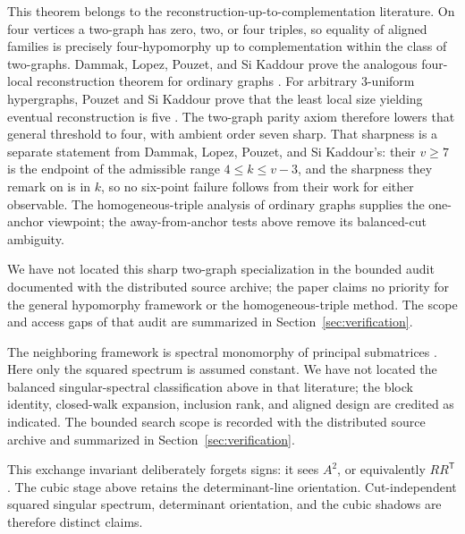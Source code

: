 This theorem belongs to the reconstruction-up-to-complementation literature.
On four vertices a two-graph has zero, two, or four triples, so equality of
aligned families is precisely four-hypomorphy up to complementation within the
class of two-graphs.  Dammak, Lopez, Pouzet, and Si Kaddour prove the analogous
four-local reconstruction theorem for ordinary graphs
\cite{DammakGraphHypomorphy}.  For arbitrary \(3\)-uniform hypergraphs,
Pouzet and Si Kaddour prove that the least local size yielding eventual
reconstruction is five \cite{PouzetHypergraphIsomorphy}.  The two-graph parity
axiom therefore lowers that general threshold to four, with ambient order
seven sharp.  That sharpness is a separate statement from Dammak, Lopez,
Pouzet, and Si Kaddour's: their \(v\ge7\) is the endpoint of the admissible
range \(4\le k\le v-3\), and the sharpness they remark on is in \(k\), so no
six-point failure follows from their work for either observable.
The homogeneous-triple analysis of ordinary graphs
\cite{PouzetHomogeneousTriples} supplies the one-anchor viewpoint; the
away-from-anchor tests above remove its balanced-cut ambiguity.

We have not located this sharp two-graph specialization in the bounded audit
documented with the distributed source archive; the paper claims no priority
for the general hypomorphy framework or the homogeneous-triple method.  The
scope and access gaps of that audit are summarized in
Section~\ref{sec:verification}.

The neighboring framework is spectral monomorphy of principal submatrices
\cite{AttasSpectralMonomorphy,BoussairiTwoGraphs}.  Here only the squared
spectrum is assumed constant.  We have not located the balanced
singular-spectral classification above in that literature; the block identity,
closed-walk expansion, inclusion rank, and aligned design are credited as
indicated.  The bounded search scope is recorded with the distributed source
archive and summarized in Section~\ref{sec:verification}.

This exchange invariant deliberately forgets signs: it sees \(A^2\), or
equivalently \(RR^{\mathsf T}\).  The cubic stage above retains the
determinant-line orientation.  Cut-independent squared singular spectrum,
determinant orientation, and the cubic shadows are therefore distinct
claims.
